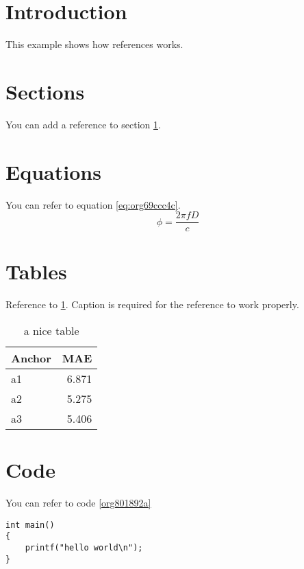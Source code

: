 


\section{Introduction}
\label{sec:orgd224335}
This example shows how references works.

\section{Sections}
\label{sec:org70fa5b2}
You can add a reference to section \ref{sec:orgd224335}.

\section{Equations}
\label{sec:orge71059c}
You can refer to equation \ref{eq:org69ccc4c}.
\begin{equation}
\label{eq:org69ccc4c}
\phi = \frac{2\pi fD}{c}
\end{equation}

\section{Tables}
\label{sec:org80f1dfd}
Reference to \ref{tab:orgd204970}.
Caption is required for the reference to work properly.

\begin{table}[htbp]
\caption{\label{tab:orgd204970}
a nice table}
\centering
\begin{tabular}{lr}
Anchor & MAE\\
\hline
a1 & 6.871\\
a2 & 5.275\\
a3 & 5.406\\
\end{tabular}
\end{table}

\section{Code}
\label{sec:orgafb569c}
You can refer to code \ref{org801892a}

\begin{verbatim}
int main()
{
    printf("hello world\n");
}
\end{verbatim}


